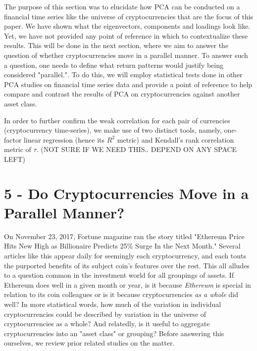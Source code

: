 \documentclass[12pt,twoside]{article}
\begin{document}
\bigbreak

The purpose of this section was to elucidate how PCA can be conducted on a financial time series like the universe of cryptocurrencies that are the focus of this paper. We have shown what the eigenvectors, components and loadings look like. Yet, we have not provided any point of reference in which to contextualize these results. This will be done in the next section, where we aim to answer the question of whether cryptocurrencies move in a parallel manner. To answer such a question, one needs to define what return patterns would justify being considered "parallel.". To do this, we will employ statistical tests done in other PCA studies on financial time series data and provide a point of reference to help compare and contrast the results of PCA on cryptocurrencies against another asset class.

In order to further confirm the weak correlation for each pair of currencies (cryptocurrency time-series), we make use of two distinct tools, namely, one-factor linear regression (hence its $R^2$ metric) and Kendall’s rank correlation metric of $\tau$. (NOT SURE IF WE NEED THIS.. DEPEND ON ANY SPACE LEFT)

\section*{5 - Do Cryptocurrencies Move in a Parallel Manner?}

On November 23, 2017, Fortune magazine ran the story titled "Ethereum Price Hits New High as Billionaire Predicts 25\% Surge In the Next Month." Several articles like this appear daily for seemingly each cryptocurrency, and each touts the purported benefits of its subject coin's features over the rest. This all alludes to a question common in the investment world for all groupings of assets. If Ethereum does well in a given month or year, is it because \textit{Ethereum} is special in relation to its coin colleagues or is it because cryptocurrencies \textit{as a whole} did well? In more statistical words, how much of the variation in individual cryptocurrencies could be described by variation in the universe of cryptocurrencies as a whole? And relatedly, is it useful to aggregate cryptocurrencies into an "asset class" or grouping? Before answering this ourselves, we review prior related studies on the matter.
\end{document}
